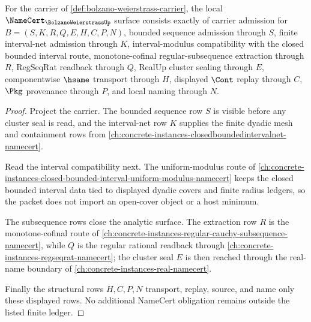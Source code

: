 \begin{theorem}
\label{thm:bolzano-weierstrass-namecert-obligations}
For the carrier of \autoref{def:bolzano-weierstrass-carrier}, the local $\NameCert_{\BolzanoWeierstrassUp}$ surface consists exactly of carrier admission for $B=(S,K,R,Q,E,H,C,P,N)$, bounded sequence admission through $S$, finite interval-net admission through $K$, interval-modulus compatibility with the closed bounded interval route, monotone-cofinal regular-subsequence extraction through $R$, RegSeqRat readback through $Q$, RealUp cluster sealing through $E$, componentwise $\hsame$ transport through $H$, displayed $\Cont$ replay through $C$, $\Pkg$ provenance through $P$, and local naming through $N$.
\end{theorem}
\begin{proof}
Project the carrier. The bounded sequence row $S$ is visible before any cluster seal is read, and the interval-net row $K$ supplies the finite dyadic mesh and containment rows from \autoref{ch:concrete-instances-closedboundedintervalnet-namecert}.

Read the interval compatibility next. The uniform-modulus route of \autoref{ch:concrete-instances-closed-bounded-interval-uniform-modulus-namecert} keeps the closed bounded interval data tied to displayed dyadic covers and finite radius ledgers, so the packet does not import an open-cover object or a host minimum.

The subsequence rows close the analytic surface. The extraction row $R$ is the monotone-cofinal route of \autoref{ch:concrete-instances-regular-cauchy-subsequence-namecert}, while $Q$ is the regular rational readback through \autoref{ch:concrete-instances-regseqrat-namecert}; the cluster seal $E$ is then reached through the real-name boundary of \autoref{ch:concrete-instances-real-namecert}.

Finally the structural rows $H,C,P,N$ transport, replay, source, and name only these displayed rows. No additional NameCert obligation remains outside the listed finite ledger.
\end{proof}

